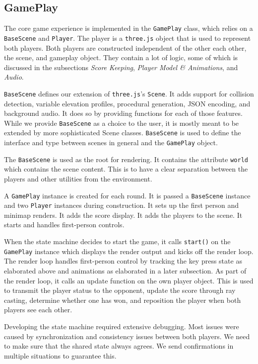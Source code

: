 \documentclass[11pt]{article}
\begin{document}
\subsection{GamePlay}
\par The core game experience is implemented in the \texttt{GamePlay} class, which relies on a \texttt{BaseScene} and \texttt{Player}. The player is a \texttt{three.js} object that is used to represent both players. Both players are constructed independent of the other each other, the scene, and gameplay object. They contain a lot of logic, some of which is discussed in the subsections \textit{Score Keeping}, \textit{Player Model \& Animations}, and \textit{Audio}.
\par \texttt{BaseScene} defines our extension of \texttt{three.js}'s \texttt{Scene}. It adds support for collision detection, variable elevation profiles, procedural generation, JSON encoding, and background audio. It does so by providing functions for each of those features. While we provide \texttt{BaseScene} as a choice to the user, it is mostly meant to be extended by more sophisticated Scene classes. \texttt{BaseScene} is used to define the interface and type between scenes in general and the \texttt{GamePlay} object.
\par The \texttt{BaseScene} is used as the root for rendering. It contains the attribute \texttt{world} which contains the scene content. This is to have a clear separation between the players and other utilities from the environment.
\par A \texttt{GamePlay} instance is created for each round. It is passed a \texttt{BaseScene} instance and two \texttt{Player} instances during construction. It sets up the first person and minimap renders. It adds the score display. It adds the players to the scene. It starts and handles first-person controls.
\par When the state machine decides to start the game, it calls \texttt{start()} on the \texttt{GamePlay} instance which displays the render output and kicks off the render loop. The render loop handles first-person control by tracking the key press state as elaborated above and animations as elaborated in a later subsection. As part of the render loop, it calls an update function on the own player object. This is used to transmit the player status to the opponent, update the score through ray casting, determine whether one has won, and reposition the player when both players see each other.
\par Developing the state machine required extensive debugging. Most issues were caused by synchronization and consistency issues between both players. We need to make sure that the shared state always agrees. We send confirmations in multiple situations to guarantee this.
\end{document}
